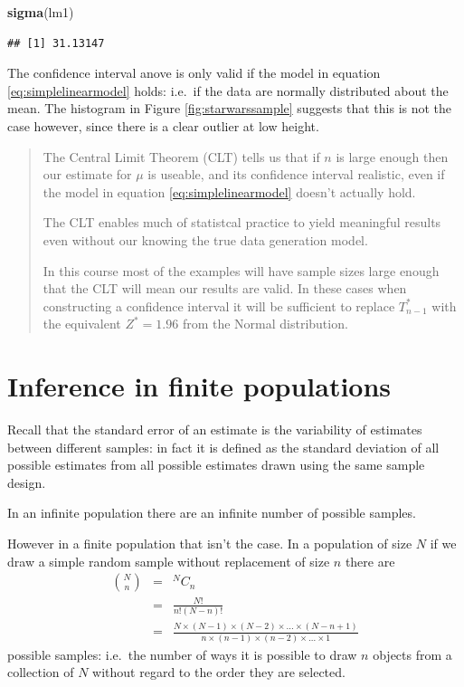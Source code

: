 \documentclass[
]{book}
\newenvironment{Shaded}{\begin{snugshade}}{\end{snugshade}}
\newcommand{\FunctionTok}[1]{\textcolor[rgb]{0.13,0.29,0.53}{\textbf{#1}}}
\newcommand{\NormalTok}[1]{#1}
\begin{document}
\begin{Shaded}
\begin{Highlighting}[]
\FunctionTok{sigma}\NormalTok{(lm1)}
\end{Highlighting}
\end{Shaded}

\begin{verbatim}
## [1] 31.13147
\end{verbatim}

The confidence interval anove is only valid if the model in equation \eqref{eq:simplelinearmodel}
holds: i.e.~if the data are normally distributed about the mean. The histogram
in Figure \ref{fig:starwarssample} suggests that this is not the case however, since
there is a clear outlier at low height.

\begin{quote}
The Central Limit Theorem (CLT) tells us that if \(n\) is large enough then our
estimate for \(\mu\) is useable, and its confidence interval realistic, even
if the model in equation \eqref{eq:simplelinearmodel} doesn't actually hold.

The CLT enables much of statistcal practice to yield meaningful results even
without our knowing the true data generation model.

In this course most of the examples will have sample sizes large enough
that the CLT will mean our results are valid. In these cases when
constructing a confidence interval it will
be sufficient to replace \(T^\ast_{n-1}\) with the equivalent \(Z^\ast=1.96\)
from the Normal distribution.
\end{quote}

\section{Inference in finite populations}\label{inference-in-finite-populations}

Recall that the standard error of an estimate is the variability
of estimates between different samples: in fact it is defined as the standard deviation
of all possible estimates from all possible estimates drawn using the
same sample design.

In an infinite population there are an infinite number of possible samples.

However in a finite population that isn't the case. In a population of size \(N\)
if we draw a simple random sample without replacement of size \(n\) there are
\begin{eqnarray}
    \binom{N}{n} &=& {}^NC_n\\
                 &=& \frac{N!}{n! (N-n)!}\\ 
                 &=& \frac{N\times (N-1)\times (N-2)\times ... \times (N-n+1)}{
                           n\times (n-1)\times (n-2)\times ... \times 1}
\end{eqnarray}
possible samples: i.e.~the number of ways it is possible to draw \(n\) objects
from a collection of \(N\) without regard to the order they are selected.
\end{document}
